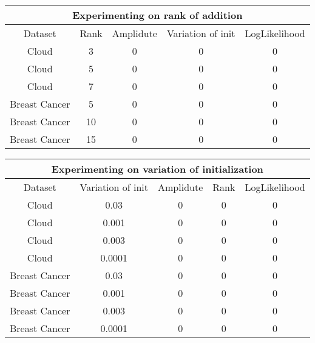 \documentclass[a4paper]{article}
\begin{document}
\begin{center}
    \begin{tabular}{||c c c c c||} 
     \hline
     \multicolumn{5}{|c|}{Experimenting on rank of addition} \\
     \hline
     Dataset & Rank & Amplidute & Variation of init & LogLikelihood \\ [0.5ex] 
     \hline\hline
     Cloud & 3 & 0 & 0 & 0\\ 
     \hline
     Cloud & 5 & 0 & 0 & 0\\
     \hline
     Cloud & 7 & 0 & 0 & 0\\
     \hline
     Breast Cancer & 5 & 0 & 0 & 0\\
     \hline
     Breast Cancer & 10 & 0 & 0 & 0\\
     \hline
     Breast Cancer & 15 & 0 & 0 & 0\\ [1ex] 
     \hline
    \end{tabular}
\end{center}

\begin{center}
    \begin{tabular}{||c c c c c||} 
     \hline
     \multicolumn{5}{|c|}{Experimenting on variation of initialization} \\
     \hline
     Dataset & Variation of init & Amplidute & Rank & LogLikelihood \\ [0.5ex] 
     \hline\hline
     Cloud & 0.03 & 0 & 0 & 0 \\
     \hline
     Cloud & 0.001 & 0 & 0 & 0 \\ 
     \hline
     Cloud & 0.003 & 0 & 0 & 0 \\ 
     \hline
     Cloud & 0.0001 & 0 & 0 & 0 \\ 
     \hline
     Breast Cancer & 0.03 & 0 & 0 & 0 \\
     \hline
     Breast Cancer & 0.001 & 0 & 0 & 0 \\ 
     \hline
     Breast Cancer & 0.003 & 0 & 0 & 0 \\ 
     \hline
     Breast Cancer & 0.0001 & 0 & 0 & 0 \\[1ex] 
     \hline
    \end{tabular}
\end{center}
\end{document}
